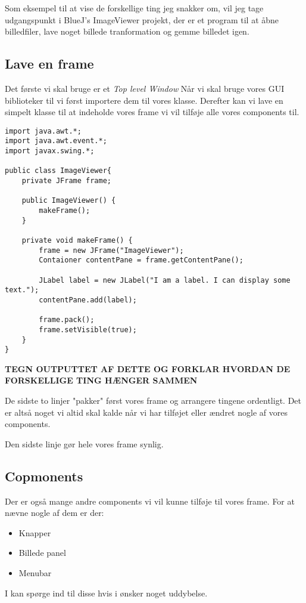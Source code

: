 \documentclass{article}
\begin{document}
Som eksempel til at vise de forskellige ting jeg snakker om, vil jeg tage udgangspunkt i BlueJ's ImageViewer projekt, der er et program til at åbne billedfiler, lave noget billede tranformation og gemme billedet igen.

\subsection*{Lave en frame}
Det første vi skal bruge er et \textit{Top level Window}
Når vi skal bruge vores GUI biblioteker til vi først importere dem til vores klasse. Derefter kan vi lave en simpelt klasse til at indeholde vores frame vi vil tilføje alle vores components til.

\begin{verbatim}
import java.awt.*;
import java.awt.event.*;
import javax.swing.*;

public class ImageViewer{
    private JFrame frame;

    public ImageViewer() {
        makeFrame();
    }

    private void makeFrame() {
        frame = new JFrame("ImageViewer");
        Contaioner contentPane = frame.getContentPane();

        JLabel label = new JLabel("I am a label. I can display some text.");
        contentPane.add(label);

        frame.pack();
        frame.setVisible(true);
    }
}
\end{verbatim}
\begin{center}
    \textbf{TEGN OUTPUTTET AF DETTE OG FORKLAR HVORDAN DE FORSKELLIGE TING HÆNGER SAMMEN}    
\end{center}

De sidste to linjer "pakker" først vores frame og arrangere tingene ordentligt. Det er altså noget vi altid skal kalde når vi har tilføjet eller ændret nogle af vores components.

Den sidste linje gør hele vores frame synlig.

\subsection*{Copmonents}
Der er også mange andre components vi vil kunne tilføje til vores frame. For at nævne nogle af dem er der:
\begin{itemize}
    \item Knapper
    \item Billede panel
    \item Menubar
\end{itemize}
I kan spørge ind til disse hvis i ønsker noget uddybelse.
\end{document}
